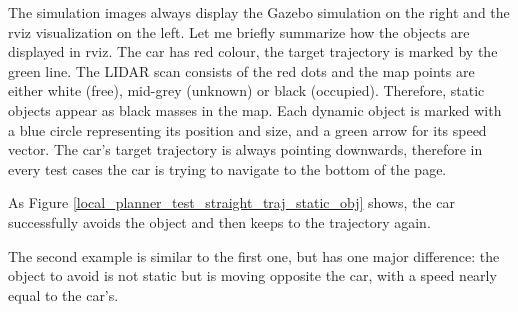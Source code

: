 The simulation images always display the Gazebo simulation on the right and the rviz visualization on the left. Let me briefly summarize how the objects are displayed in rviz. The car has red colour, the target trajectory is marked by the green line. The LIDAR scan consists of the red dots and the map points are either white (free), mid-grey (unknown) or black (occupied). Therefore, static objects appear as black masses in the map. Each dynamic object is marked with a blue circle representing its position and size, and a green arrow for its speed vector. The car's target trajectory is always pointing downwards, therefore in every test cases the car is trying to navigate to the bottom of the page.

As Figure \ref{local_planner_test_straight_traj_static_obj} shows, the car successfully avoids the object and then keeps to the trajectory again.

The second example is similar to the first one, but has one major difference: the object to avoid is not static but is moving opposite the car, with a speed nearly equal to the car's.

